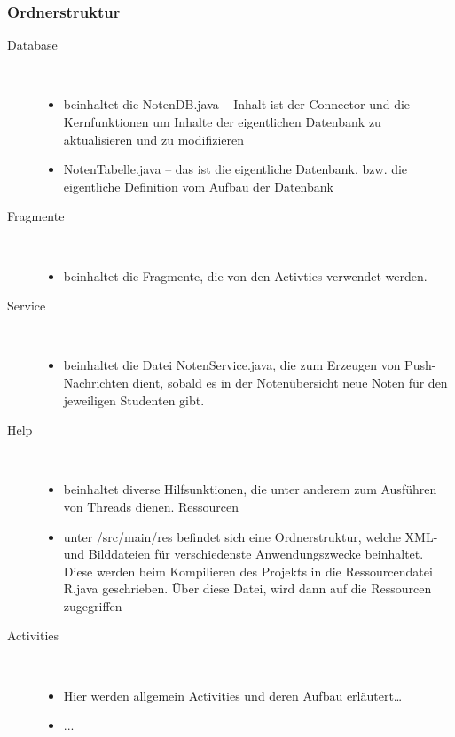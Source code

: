 \subsubsection{Ordnerstruktur}
\begin{description}
\item[Database]~\par
\begin{itemize}
\item beinhaltet die NotenDB.java – Inhalt ist der Connector und die Kernfunktionen um Inhalte der eigentlichen Datenbank zu aktualisieren und zu modifizieren
\item NotenTabelle.java – das ist die eigentliche Datenbank, bzw. die eigentliche Definition vom Aufbau der Datenbank
\end{itemize}

 
\item[Fragmente]~\par
\begin{itemize}
\item beinhaltet die Fragmente, die von den Activties verwendet werden.
\end{itemize}

\item[Service]~\par
\begin{itemize}
\item beinhaltet die Datei NotenService.java, die zum Erzeugen von Push-Nachrichten dient, sobald es in der Notenübersicht neue Noten für den jeweiligen Studenten gibt.
\end{itemize}

 
\item[Help]~\par
\begin{itemize}
\item beinhaltet diverse Hilfsunktionen, die unter anderem zum Ausführen von Threads dienen.
Ressourcen
\item unter /src/main/res befindet sich eine Ordnerstruktur, welche XML- und Bilddateien für verschiedenste Anwendungszwecke beinhaltet. Diese werden beim Kompilieren des Projekts in die Ressourcendatei R.java geschrieben. Über diese Datei, wird dann auf die Ressourcen zugegriffen
\end{itemize}

\item[Activities]~\par
\begin{itemize}
\item Hier werden allgemein Activities und deren Aufbau erläutert…
\item ...
\end{itemize}


\end{description}

